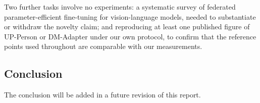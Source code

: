 Two further tasks involve no experiments: a systematic survey of federated parameter-efficient fine-tuning for vision-language models, needed to substantiate or withdraw the novelty claim; and reproducing at least one published figure of UP-Person or DM-Adapter under our own protocol, to confirm that the reference points used throughout are comparable with our measurements.

\subsection{Conclusion}

The conclusion will be added in a future revision of this report.
